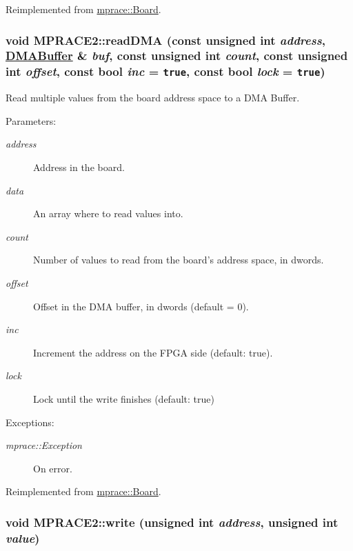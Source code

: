 Reimplemented from \hyperlink{classmprace_1_1Board_a6}{mprace::Board}.\hypertarget{classmprace_1_1MPRACE2_a7}{
\subsubsection[readDMA]{\setlength{\rightskip}{0pt plus 5cm}void MPRACE2::read\-DMA (const unsigned int {\em address}, \hyperlink{classmprace_1_1DMABuffer}{DMABuffer} \& {\em buf}, const unsigned int {\em count}, const unsigned int {\em offset}, const bool {\em inc} = {\tt true}, const bool {\em lock} = {\tt true})}}
\label{classmprace_1_1MPRACE2_a7}


Read multiple values from the board address space to a DMA Buffer. 

\begin{Desc}
\item[Parameters:]
\begin{description}
\item[{\em address}]Address in the board. \item[{\em data}]An array where to read values into. \item[{\em count}]Number of values to read from the board's address space, in dwords. \item[{\em offset}]Offset in the DMA buffer, in dwords (default = 0). \item[{\em inc}]Increment the address on the FPGA side (default: true). \item[{\em lock}]Lock until the write finishes (default: true) \end{description}
\end{Desc}
\begin{Desc}
\item[Exceptions:]
\begin{description}
\item[{\em mprace::Exception}]On error.\end{description}
\end{Desc}


Reimplemented from \hyperlink{classmprace_1_1Board_a8}{mprace::Board}.\hypertarget{classmprace_1_1MPRACE2_a2}{
\subsubsection[write]{\setlength{\rightskip}{0pt plus 5cm}void MPRACE2::write (unsigned int {\em address}, unsigned int {\em value})}}
\label{classmprace_1_1MPRACE2_a2}


